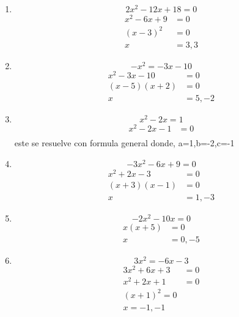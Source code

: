 \documentclass[12pt,letterpaper]{report}
\begin{document}
\begin{enumerate}
\begin{equation*}
    3x^2+2x-8=0
\end{equation*}
\begin{align*}
    (3x-2)(x+4)&=0\\
    x&=-4,2/3
\end{align*}
\item \begin{equation*}
    2x^2-12x+18=0
\end{equation*}
\begin{align*}
    x^2-6x+9&=0\\
    (x-3)^2&=0\\
    x&=3,3
\end{align*}
\item \begin{equation*}
    -x^2=-3x-10
\end{equation*}
\begin{align*}
    x^2-3x-10&=0\\
    (x-5)(x+2)&=0\\
    x&=5,-2
\end{align*}
\item \begin{equation*}
    x^2-2x=1
\end{equation*}
\begin{align*}
    x^2-2x-1&=0\\
\end{align*}
este se resuelve con formula general donde, a=1,b=-2,c=-1
\item \begin{equation*}
    -3x^2-6x+9=0
\end{equation*}
\begin{align*}
    x^2+2x-3&=0\\
    (x+3)(x-1)&=0\\
    x&=1,-3
\end{align*}
\item \begin{equation*}
    -2x^2-10x=0
\end{equation*}
\begin{align*}
    x(x+5)&=0\\
    x&=0,-5
\end{align*}
\item \begin{equation*}
    3x^2=-6x-3
\end{equation*}
\begin{align*}
    3x^2+6x+3&=0\\
    x^2+2x+1&=0\\
    (x+1)^2=0\\
    x=-1,-1
\end{align*}
\end{enumerate}
\end{document}
